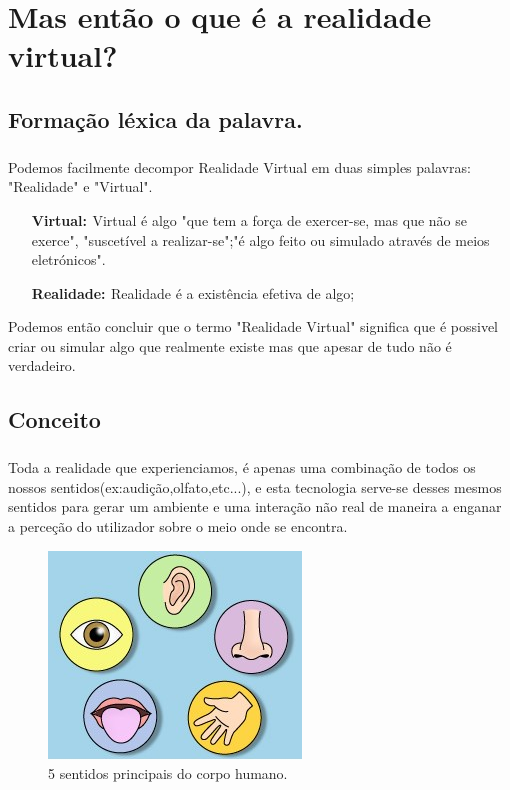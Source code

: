 \chapter{\bf Mas então o que é a realidade virtual?}
\paragraph{}
\section{Formação léxica da palavra.}
\paragraph{}
Podemos facilmente decompor Realidade Virtual em duas simples palavras: "Realidade" e "Virtual".
\begin{enumerate}
\item[\bf{Virtual: }]Virtual é algo "que tem a força de exercer-se, mas que não se exerce", "suscetível a realizar-se";"é algo feito ou simulado através de meios eletrónicos"\cite{7}.
\item[\bf{Realidade: }]Realidade é a existência efetiva de algo;
\end{enumerate}

Podemos então concluir que o termo "Realidade Virtual" significa que é possivel criar ou simular algo que realmente existe mas que apesar de tudo não é verdadeiro.
\section{Conceito}
\paragraph{}
	Toda a realidade que experienciamos, é apenas uma combinação de todos os nossos sentidos(ex:audição,olfato,etc...), e esta tecnologia serve-se desses mesmos sentidos para gerar um ambiente e uma interação não real de maneira a enganar a perceção do utilizador sobre o meio onde se encontra.
	\begin{figure}
	\center
	\includegraphics[scale=0.4]{imagens/sentidos.jpg}
	\caption{5 sentidos principais do corpo humano.\cite{1} }
	\end{figure}
	
